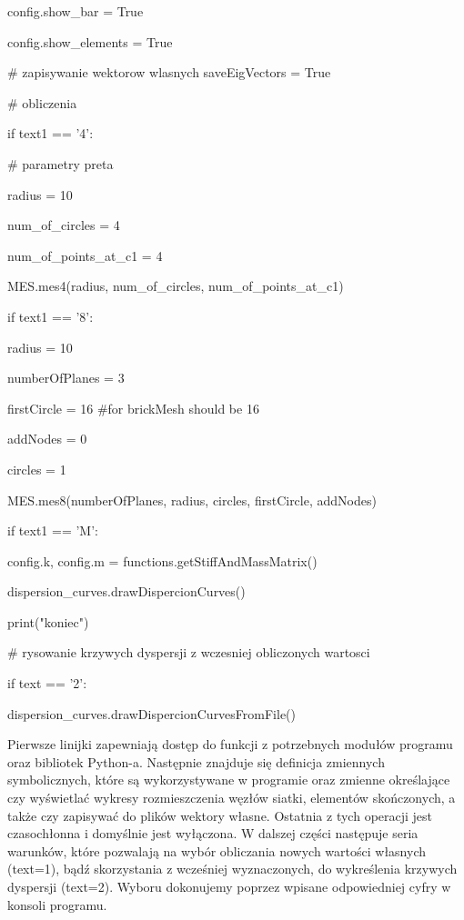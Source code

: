         config.show\_bar = True

        config.show\_elements = True

\vspace{3mm}

        \# zapisywanie wektorow wlasnych
        saveEigVectors = True

\vspace{3mm}
        \# obliczenia

        if text1 == '4':

            \# parametry preta

            radius = 10

            num\_of\_circles = 4

            num\_of\_points\_at\_c1 = 4

            MES.mes4(radius, num\_of\_circles, num\_of\_points\_at\_c1)

\vspace{3mm}

        if text1 == '8':

            radius = 10

            numberOfPlanes = 3

            firstCircle = 16 \#for brickMesh should be 16

            addNodes = 0

            circles = 1

            MES.mes8(numberOfPlanes, radius, circles, firstCircle, addNodes)

\vspace{3mm}
        if text1 == 'M':

            config.k, config.m = functions.getStiffAndMassMatrix()

        dispersion\_curves.drawDispercionCurves()

        print("koniec")

\vspace{3mm}
    \# rysowanie krzywych dyspersji z wczesniej obliczonych wartosci

    if text == '2':

        dispersion\_curves.drawDispercionCurvesFromFile()

\vspace{3mm}
Pierwsze linijki zapewniają dostęp do funkcji z potrzebnych modułów programu oraz bibliotek Python-a. Następnie znajduje się definicja zmiennych symbolicznych, które są wykorzystywane w programie oraz zmienne określające czy wyświetlać wykresy rozmieszczenia węzłów siatki, elementów skończonych, a także czy zapisywać do plików wektory własne. Ostatnia z tych operacji jest czasochłonna i domyślnie jest wyłączona. W dalszej części następuje seria warunków, które pozwalają na wybór obliczania nowych wartości własnych (text=1), bądź skorzystania z wcześniej wyznaczonych, do wykreślenia krzywych dyspersji (text=2). Wyboru dokonujemy poprzez wpisane odpowiedniej cyfry w konsoli programu. 

